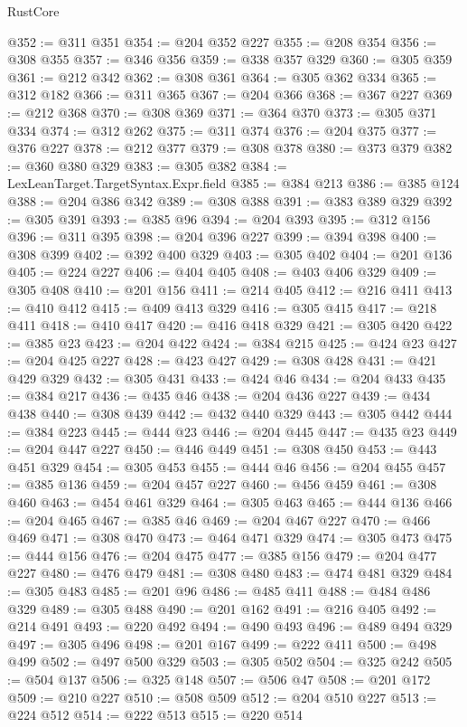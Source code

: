 \begin{lexlean}{RustCore}
\begin{coremodule}
@352 := @311 @351
@354 := @204 @352 @227
@355 := @208 @354
@356 := @308 @355
@357 := @346 @356
@359 := @338 @357 @329
@360 := @305 @359
@361 := @212 @342
@362 := @308 @361
@364 := @305 @362 @334
@365 := @312 @182
@366 := @311 @365
@367 := @204 @366
@368 := @367 @227
@369 := @212 @368
@370 := @308 @369
@371 := @364 @370
@373 := @305 @371 @334
@374 := @312 @262
@375 := @311 @374
@376 := @204 @375
@377 := @376 @227
@378 := @212 @377
@379 := @308 @378
@380 := @373 @379
@382 := @360 @380 @329
@383 := @305 @382
@384 := LexLeanTarget.TargetSyntax.Expr.field
@385 := @384 @213
@386 := @385 @124
@388 := @204 @386 @342
@389 := @308 @388
@391 := @383 @389 @329
@392 := @305 @391
@393 := @385 @96
@394 := @204 @393
@395 := @312 @156
@396 := @311 @395
@398 := @204 @396 @227
@399 := @394 @398
@400 := @308 @399
@402 := @392 @400 @329
@403 := @305 @402
@404 := @201 @136
@405 := @224 @227
@406 := @404 @405
@408 := @403 @406 @329
@409 := @305 @408
@410 := @201 @156
@411 := @214 @405
@412 := @216 @411
@413 := @410 @412
@415 := @409 @413 @329
@416 := @305 @415
@417 := @218 @411
@418 := @410 @417
@420 := @416 @418 @329
@421 := @305 @420
@422 := @385 @23
@423 := @204 @422
@424 := @384 @215
@425 := @424 @23
@427 := @204 @425 @227
@428 := @423 @427
@429 := @308 @428
@431 := @421 @429 @329
@432 := @305 @431
@433 := @424 @46
@434 := @204 @433
@435 := @384 @217
@436 := @435 @46
@438 := @204 @436 @227
@439 := @434 @438
@440 := @308 @439
@442 := @432 @440 @329
@443 := @305 @442
@444 := @384 @223
@445 := @444 @23
@446 := @204 @445
@447 := @435 @23
@449 := @204 @447 @227
@450 := @446 @449
@451 := @308 @450
@453 := @443 @451 @329
@454 := @305 @453
@455 := @444 @46
@456 := @204 @455
@457 := @385 @136
@459 := @204 @457 @227
@460 := @456 @459
@461 := @308 @460
@463 := @454 @461 @329
@464 := @305 @463
@465 := @444 @136
@466 := @204 @465
@467 := @385 @46
@469 := @204 @467 @227
@470 := @466 @469
@471 := @308 @470
@473 := @464 @471 @329
@474 := @305 @473
@475 := @444 @156
@476 := @204 @475
@477 := @385 @156
@479 := @204 @477 @227
@480 := @476 @479
@481 := @308 @480
@483 := @474 @481 @329
@484 := @305 @483
@485 := @201 @96
@486 := @485 @411
@488 := @484 @486 @329
@489 := @305 @488
@490 := @201 @162
@491 := @216 @405
@492 := @214 @491
@493 := @220 @492
@494 := @490 @493
@496 := @489 @494 @329
@497 := @305 @496
@498 := @201 @167
@499 := @222 @411
@500 := @498 @499
@502 := @497 @500 @329
@503 := @305 @502
@504 := @325 @242
@505 := @504 @137
@506 := @325 @148
@507 := @506 @47
@508 := @201 @172
@509 := @210 @227
@510 := @508 @509
@512 := @204 @510 @227
@513 := @224 @512
@514 := @222 @513
@515 := @220 @514

\end{coremodule}
\end{lexlean}
